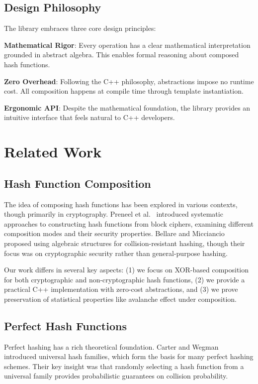 \documentclass[11pt,a4paper]{article}
\theoremstyle{definition}
\begin{document}
\subsection{Design Philosophy}

The library embraces three core design principles:

\textbf{Mathematical Rigor}: Every operation has a clear mathematical interpretation grounded in abstract algebra. This enables formal reasoning about composed hash functions.

\textbf{Zero Overhead}: Following the C++ philosophy, abstractions impose no runtime cost. All composition happens at compile time through template instantiation.

\textbf{Ergonomic API}: Despite the mathematical foundation, the library provides an intuitive interface that feels natural to C++ developers.

\section{Related Work}

\subsection{Hash Function Composition}

The idea of composing hash functions has been explored in various contexts, though primarily in cryptography. Preneel et al.~\cite{composition} introduced systematic approaches to constructing hash functions from block ciphers, examining different composition modes and their security properties. Bellare and Micciancio~\cite{algebraic} proposed using algebraic structures for collision-resistant hashing, though their focus was on cryptographic security rather than general-purpose hashing.

Our work differs in several key aspects: (1) we focus on XOR-based composition for both cryptographic and non-cryptographic hash functions, (2) we provide a practical C++ implementation with zero-cost abstractions, and (3) we prove preservation of statistical properties like avalanche effect under composition.

\subsection{Perfect Hash Functions}

Perfect hashing has a rich theoretical foundation. Carter and Wegman~\cite{universal} introduced universal hash families, which form the basis for many perfect hashing schemes. Their key insight was that randomly selecting a hash function from a universal family provides probabilistic guarantees on collision probability.
\end{document}

